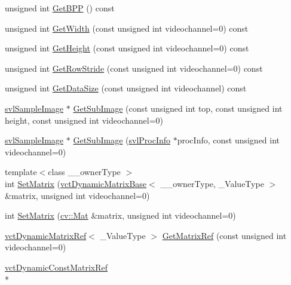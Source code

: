 \begin{DoxyCompactItemize}
\item 
unsigned int \hyperlink{classsvl_sample_image_custom_a86dacd22703fbe2f2ac527995c90b704}{Get\-B\-P\-P} () const 
\item 
unsigned int \hyperlink{classsvl_sample_image_custom_af03ade3f099c87b685ad52c0183deac8}{Get\-Width} (const unsigned int videochannel=0) const 
\item 
unsigned int \hyperlink{classsvl_sample_image_custom_aa65d95dad39f90d1f84a9dd978120d95}{Get\-Height} (const unsigned int videochannel=0) const 
\item 
unsigned int \hyperlink{classsvl_sample_image_custom_a82aa2aea1a4d809685cf3c50d7eaaed3}{Get\-Row\-Stride} (const unsigned int videochannel=0) const 
\item 
unsigned int \hyperlink{classsvl_sample_image_custom_a09cde03b41e68144c2d11ce705914fcb}{Get\-Data\-Size} (const unsigned int videochannel) const 
\item 
\hyperlink{classsvl_sample_image}{svl\-Sample\-Image} $\ast$ \hyperlink{classsvl_sample_image_custom_a557f36a16a924eb9fcdd7231a61fb63e}{Get\-Sub\-Image} (const unsigned int top, const unsigned int height, const unsigned int videochannel=0)
\item 
\hyperlink{classsvl_sample_image}{svl\-Sample\-Image} $\ast$ \hyperlink{classsvl_sample_image_custom_af1641340334bb3ab547f17beb3f04383}{Get\-Sub\-Image} (\hyperlink{structsvl_proc_info}{svl\-Proc\-Info} $\ast$proc\-Info, const unsigned int videochannel=0)
\item 
{\footnotesize template$<$class \-\_\-\-\_\-owner\-Type $>$ }\\int \hyperlink{classsvl_sample_image_custom_aea63e2d0635a36a2123e4680d9ff78b2}{Set\-Matrix} (\hyperlink{classvct_dynamic_matrix_base}{vct\-Dynamic\-Matrix\-Base}$<$ \-\_\-\-\_\-owner\-Type, \-\_\-\-Value\-Type $>$ \&matrix, unsigned int videochannel=0)
\item 
int \hyperlink{classsvl_sample_image_custom_aae088ff614ece50824810c7a945e8264}{Set\-Matrix} (\hyperlink{namespacecv_a60d81b54f4914bec4cc4a72ab77eb444}{cv\-::\-Mat} \&matrix, unsigned int videochannel=0)
\item 
\hyperlink{classvct_dynamic_matrix_ref}{vct\-Dynamic\-Matrix\-Ref}$<$ \-\_\-\-Value\-Type $>$ \hyperlink{classsvl_sample_image_custom_ab48c98ffb5e68bcdbeb67b18f203dc64}{Get\-Matrix\-Ref} (const unsigned int videochannel=0)
\item 
\hyperlink{classvct_dynamic_const_matrix_ref}{vct\-Dynamic\-Const\-Matrix\-Ref}\\*

\end{DoxyCompactItemize}
